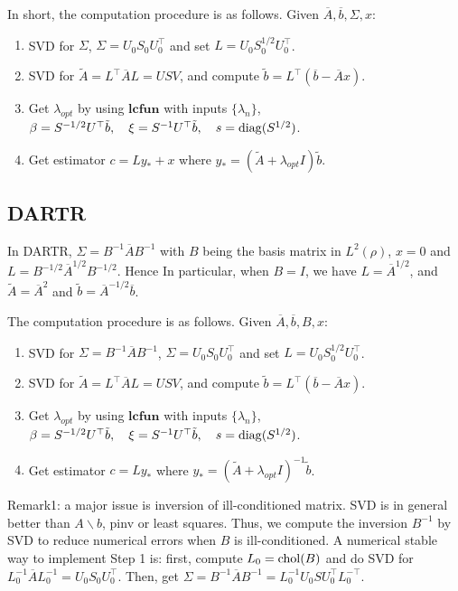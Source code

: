 \documentclass{article} %
\theoremstyle{plain}
\numberwithin{equation}{section}
\def\Abar{\overline{A}}
\def\bbar{\overline{b}}
\begin{document}
In short, the computation procedure is as follows.  Given $\Abar,\bbar,\Sigma, x$: 
\begin{enumerate}
\item SVD for $\Sigma$, $\Sigma = U_0 S_0 U_0^\top$ and set $L= U_0 S_0^{1/2}U_0^\top$. 
\item SVD for $\tilde A =  L^\top \Abar L = USV$, and compute $\tilde b = L^\top (\bbar -\Abar x)$.
\item Get $\lambda_{opt}$ by using $\textbf{lcfun}$ with inputs $\{\lambda_n\}$, $\beta= S^{-1/2}U^\top \tilde b, \quad \xi = S^{-1}U^\top \tilde b, \quad s = {\rm diag}(S^{1/2})$. 
\item Get estimator $c = Ly_*+x$ where $y_*= (\tilde A + \lambda_{opt} I) \tilde b$. 
\end{enumerate}
\subsection{DARTR}
In DARTR, 
$\Sigma =B^{-1} \Abar B^{-1}$ with $B$ being the basis matrix in $L^2(\rho)$, $x = 0$ and $L = 
B^{-1/2} \Abar^{1/2} B^{-1/2}$. Hence
In particular, when $B= I$, we have $L= \Abar^{1/2}$, and $\tilde A =\Abar^2$ and $\tilde b = \Abar^{-1/2} \bbar$. 


The computation procedure is as follows.  Given $\Abar,\bbar,B, x$: 
\begin{enumerate}
\item SVD for $\Sigma = B^{-1}\Abar B^{-1}$, $\Sigma = U_0 S_0 U_0^\top$ and set $L= U_0 S_0^{1/2}U_0^\top$. 
\item SVD for $\tilde A =  L^\top \Abar L = USV$, and compute $\tilde b = L^\top (\bbar -\Abar x)$.
\item Get $\lambda_{opt}$ by using $\textbf{lcfun}$ with inputs $\{\lambda_n\}$, $\beta= S^{-1/2}U^\top \tilde b, \quad \xi = S^{-1}U^\top \tilde b, \quad s = {\rm diag}(S^{1/2})$. 
\item Get estimator $c = Ly_*$ where $y_*= (\tilde A + \lambda_{opt} I)^{-1} \tilde b$. 
\end{enumerate}


Remark1: a major issue is inversion of ill-conditioned matrix. SVD is in general better than $A\backslash b$, pinv or least squares.  Thus, we compute the inversion $B^{-1}$ by SVD to reduce numerical errors when $B$ is ill-conditioned.  A numerical stable way to implement Step 1 is: first, compute $ L_0 = {\rm chol}(B)$ and do SVD for $L_0^{-1}\Abar L_0^{-1} = U_0 S_0 U_0^\top$. Then, get $\Sigma = B^{-1}\Abar B^{-1}= L_0^{-1}U_0 S U_0^\top L_0^{-\top} $. 
\end{document}
